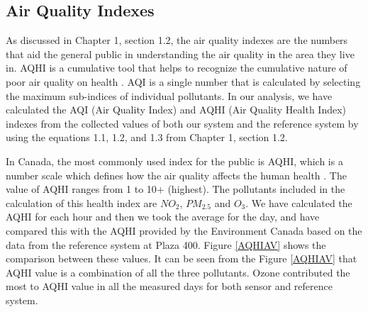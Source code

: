 \subsection{Air Quality Indexes}


As discussed in Chapter 1, section 1.2, the air quality indexes are the numbers that aid the general public in understanding the air quality in the area they live in. AQHI is a cumulative tool that helps to recognize the cumulative nature of poor air quality on health \cite{hasselback2010air}.  AQI is a single number that is calculated by selecting the maximum sub-indices of individual pollutants. In our analysis, we have calculated the AQI (Air Quality Index) and AQHI (Air Quality Health Index) indexes from the collected values of both our system and the reference system by using the equations 1.1, 1.2, and 1.3 from Chapter 1, section 1.2.

In Canada, the most commonly used index for the public is AQHI, which is a number scale which defines how the air quality affects the human health \cite{AQHICAN}. The value of AQHI ranges from 1 to 10+ (highest). The pollutants included in the calculation of this health index are $NO_{2}$, $PM_{2.5}$ and $O_{3}$. We have calculated the AQHI for each hour and then we took the average for the day, and have compared this with the AQHI provided by the Environment Canada based on the data from the reference system at Plaza 400. Figure \ref{AQHIAV} shows the comparison between these values. It can be seen from the Figure \ref{AQHIAV} that AQHI value is a combination of all the three pollutants. Ozone contributed the most to AQHI value in all the measured days for both sensor and reference system.

